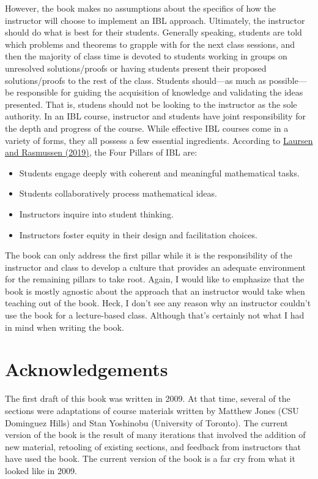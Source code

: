 \documentclass[11pt]{article}%
\newcommand{\blankline}{\pagebreak[2]\vspace{.5\baselineskip}}
\begin{document}
\blankline

However, the book makes no assumptions about the specifics of how the instructor will choose to implement an IBL approach. Ultimately, the instructor should do what is best for their students. Generally speaking, students are told which problems and theorems to grapple with for the next class sessions, and then the majority of class time is devoted to students working in groups on unresolved solutions/proofs or having students present their proposed solutions/proofs to the rest of the class. Students should---as much as possible---be responsible for guiding the acquisition of knowledge and validating the ideas presented. That is, studens should not be looking to the instructor as the sole authority. In an IBL course, instructor and students have joint responsibility for the depth and progress of the course. While effective IBL courses come in a variety of forms, they all possess a few essential ingredients. According to \href{https://www.colorado.edu/eer/sites/default/files/attached-files/laursenrasmussencommentaryauthorversion0219.pdf}{Laursen and Rasmussen (2019)}, the Four Pillars of IBL are:
\begin{itemize}
\item Students engage deeply with coherent and meaningful mathematical tasks.
\item Students collaboratively process mathematical ideas.
\item Instructors inquire into student thinking.
\item Instructors foster equity in their design and facilitation choices.
\end{itemize}
The book can only address the first pillar while it is the responsibility of the instructor and class to develop a culture that provides an adequate environment for the remaining pillars to take root. Again, I would like to emphasize that the book is mostly agnostic about the approach that an instructor would take when teaching out of the book.  Heck, I don't see any reason why an instructor couldn't use the book for a lecture-based class. Although that's certainly not what I had in mind when writing the book.

\section*{Acknowledgements}

The first draft of this book was written in 2009. At that time, several of the sections were adaptations of course materials written by Matthew Jones (CSU Dominguez Hills) and Stan Yoshinobu (University of Toronto). The current version of the book is the result of many iterations that involved the addition of new material, retooling of existing sections, and feedback from instructors that have used the book. The current version of the book is a far cry from what it looked like in 2009.
\end{document}
